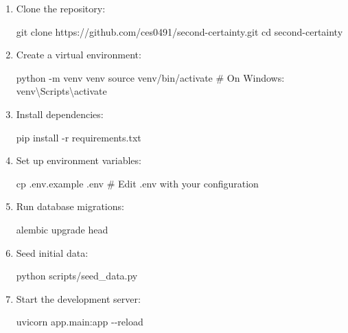 \documentclass[
  11pt,
  letterpaper,
]{article}
\newenvironment{Shaded}{\begin{snugshade}}{\end{snugshade}}
\newcommand{\AttributeTok}[1]{\textcolor[rgb]{0.40,0.45,0.13}{#1}}
\newcommand{\BuiltInTok}[1]{\textcolor[rgb]{0.00,0.23,0.31}{#1}}
\newcommand{\CommentTok}[1]{\textcolor[rgb]{0.37,0.37,0.37}{#1}}
\newcommand{\ExtensionTok}[1]{\textcolor[rgb]{0.00,0.23,0.31}{#1}}
\newcommand{\FunctionTok}[1]{\textcolor[rgb]{0.28,0.35,0.67}{#1}}
\newcommand{\NormalTok}[1]{\textcolor[rgb]{0.00,0.23,0.31}{#1}}
\begin{document}
\begin{enumerate}
\def\labelenumi{\arabic{enumi}.}
\item
  Clone the repository:

\begin{Shaded}
\begin{Highlighting}[]
\FunctionTok{git}\NormalTok{ clone https://github.com/ces0491/second{-}certainty.git}
\BuiltInTok{cd}\NormalTok{ second{-}certainty}
\end{Highlighting}
\end{Shaded}
\item
  Create a virtual environment:

\begin{Shaded}
\begin{Highlighting}[]
\ExtensionTok{python} \AttributeTok{{-}m}\NormalTok{ venv venv}
\BuiltInTok{source}\NormalTok{ venv/bin/activate  }\CommentTok{\# On Windows: venv\textbackslash{}Scripts\textbackslash{}activate}
\end{Highlighting}
\end{Shaded}
\item
  Install dependencies:

\begin{Shaded}
\begin{Highlighting}[]
\ExtensionTok{pip}\NormalTok{ install }\AttributeTok{{-}r}\NormalTok{ requirements.txt}
\end{Highlighting}
\end{Shaded}
\item
  Set up environment variables:

\begin{Shaded}
\begin{Highlighting}[]
\FunctionTok{cp}\NormalTok{ .env.example .env}
\CommentTok{\# Edit .env with your configuration}
\end{Highlighting}
\end{Shaded}
\item
  Run database migrations:

\begin{Shaded}
\begin{Highlighting}[]
\ExtensionTok{alembic}\NormalTok{ upgrade head}
\end{Highlighting}
\end{Shaded}
\item
  Seed initial data:

\begin{Shaded}
\begin{Highlighting}[]
\ExtensionTok{python}\NormalTok{ scripts/seed\_data.py}
\end{Highlighting}
\end{Shaded}
\item
  Start the development server:

\begin{Shaded}
\begin{Highlighting}[]
\ExtensionTok{uvicorn}\NormalTok{ app.main:app }\AttributeTok{{-}{-}reload}
\end{Highlighting}
\end{Shaded}
\end{enumerate}
\end{document}
